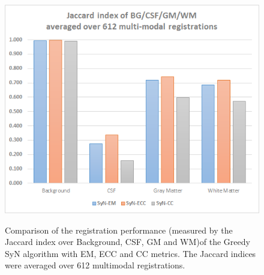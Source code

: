 \begin{figure}[H]
\centering
\includegraphics[width=0.5\linewidth]{./images/multi_graph_segTri_fill.png}\\
\caption{Comparison of the registration performance (measured by the Jaccard index over Background, CSF, GM and WM)of the Greedy SyN algorithm with EM, ECC and CC metrics. The Jaccard
indices were averaged over 612 multimodal registrations.}
\label{fig:multi_graph_segTri_fill}
\end{figure}
